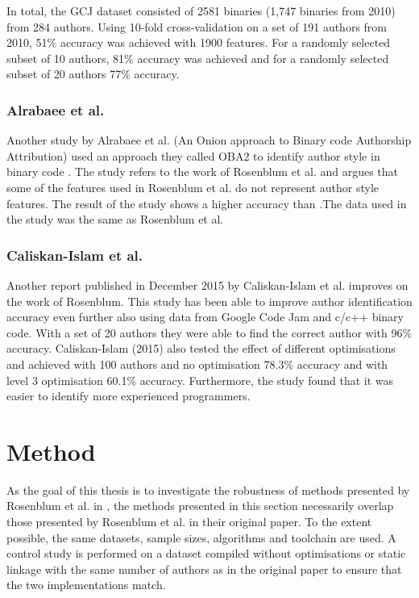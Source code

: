 \documentclass[a4paper,11pt]{kth-mag}
\begin{document}
In total, the GCJ dataset consisted of 2581 binaries (1,747 binaries from
2010) from 284 authors. Using 10-fold cross-validation on a set of 191 authors
from 2010, 51\% accuracy was achieved with 1900 features. For a randomly selected subset of 10
authors, 81\% accuracy was achieved and for a randomly selected subset of 20
authors 77\% accuracy.

\subsection{Alrabaee et al.}
Another study by Alrabaee et al. (An Onion approach to Binary code Authorship
Attribution) used an approach they called OBA2 to identify author style in
binary code \parencite{alrabaee2014oba2}. The study refers to the work of
Rosenblum et al. and argues that some of the features used in Rosenblum et al.
do not represent author style features. The result of the study
shows a higher accuracy than \parencite{rosenblum2011wrote}.The data used in
the study was the same as Rosenblum et al. 

\subsection{Caliskan-Islam et al.}
Another report published in December 2015 by Caliskan-Islam et al. improves on
the work of Rosenblum. This study has been able to improve author
identification accuracy even further also using data from Google Code Jam and
c/c++ binary code. With a set of 20 authors they were able to find the correct
author with 96\% accuracy. Caliskan-Islam (2015) also tested the effect of
different optimisations and achieved with 100 authors and no optimisation 78.3\%
accuracy and with level 3 optimisation 60.1\% accuracy. Furthermore, the study
found that it was easier to identify more experienced programmers.

\chapter{Method} \label{ch:method}
As the goal of this thesis is to investigate the robustness of methods
presented by Rosenblum et al. in \parencite{rosenblum2011wrote}, the methods
presented in this section necessarily overlap those presented by Rosenblum et
al. in their original paper. To the extent possible, the same datasets, sample
sizes, algorithms and toolchain are used. A control study is performed on a
dataset compiled without optimisations or static linkage with the same number
of authors as in the original paper to ensure that the two implementations
match. 
\end{document}
